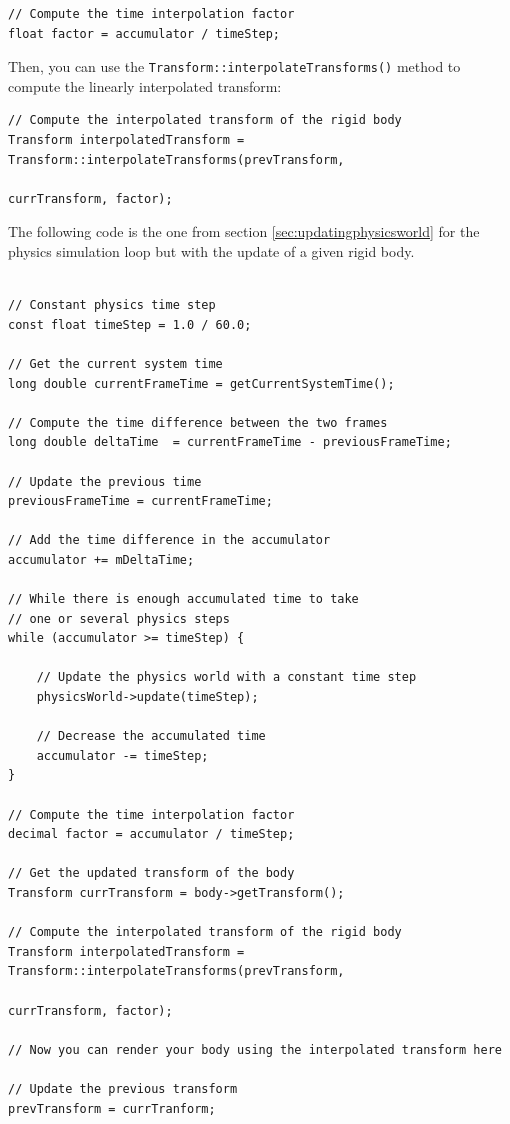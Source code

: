 \documentclass[a4paper,12pt]{article}
\begin{document}
    \begin{lstlisting}
// Compute the time interpolation factor
float factor = accumulator / timeStep;
    \end{lstlisting}

    \vspace{0.6cm}

    Then, you can use the \texttt{Transform::interpolateTransforms()} method to compute the linearly interpolated transform:  \\

    \begin{lstlisting}
// Compute the interpolated transform of the rigid body
Transform interpolatedTransform = Transform::interpolateTransforms(prevTransform,
                                                          currTransform, factor);
  \end{lstlisting}

    \vspace{0.6cm}

    The following code is the one from section \ref{sec:updatingphysicsworld} for the physics simulation loop but with the update of a given rigid body. \\
    
    \begin{lstlisting}

// Constant physics time step
const float timeStep = 1.0 / 60.0;

// Get the current system time
long double currentFrameTime = getCurrentSystemTime();

// Compute the time difference between the two frames
long double deltaTime  = currentFrameTime - previousFrameTime;

// Update the previous time
previousFrameTime = currentFrameTime;

// Add the time difference in the accumulator
accumulator += mDeltaTime;

// While there is enough accumulated time to take
// one or several physics steps
while (accumulator >= timeStep) {

    // Update the physics world with a constant time step
    physicsWorld->update(timeStep);

    // Decrease the accumulated time
    accumulator -= timeStep;
}

// Compute the time interpolation factor
decimal factor = accumulator / timeStep;

// Get the updated transform of the body
Transform currTransform = body->getTransform();

// Compute the interpolated transform of the rigid body
Transform interpolatedTransform = Transform::interpolateTransforms(prevTransform,
                                                           currTransform, factor);

// Now you can render your body using the interpolated transform here

// Update the previous transform
prevTransform = currTranform;

    \end{lstlisting}
\end{document}
